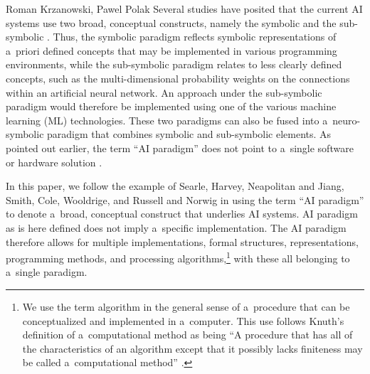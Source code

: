 \begin{artengenv2auth}{Roman Krzanowski, Pawel Polak}
Several studies have posited that the current AI systems use two broad, conceptual constructs, namely the symbolic and the sub-symbolic
\parencites[e.g.,][]{searle_mind_1998}[][]{harvey_perspectives_2013}[][]{neapolitan_artificial_2018}[][]{mitchell_artificial_2019}[][]{smith_promise_2019}[][]{cole_chinese}[][]{russell_artificial_2020}[][]{wooldridge_road_2021}. %
 Thus, the symbolic paradigm reflects symbolic representations of a~priori defined concepts that may be implemented in various programming environments, while the sub-symbolic paradigm relates to less clearly defined concepts, such as the multi-dimensional probability weights on the connections within an artificial neural network. An approach under the sub-symbolic paradigm would therefore be implemented using one of the various machine learning (ML) technologies. These two paradigms can also be fused into a~neuro-symbolic paradigm 
\parencites[e.g.,][]{bader_dimensions_2005}[][]{garcez_neural-symbolic_2019}[][]{garcez_neurosymbolic_2020}[][]{kautz_third_2022} %
 that combines symbolic and sub-symbolic elements. As pointed out earlier, the term ``AI paradigm'' does not point to a~single software or hardware solution 
\parencites[see][]{minsky_logical_1991}[][]{russell_artificial_2020}.%

In this paper, we follow the example of Searle, Harvey, Neapolitan and Jiang, Smith, Cole, Wooldrige, and Russell and Norwig in using the term ``AI paradigm'' to denote a~broad, conceptual construct that underlies AI systems. AI paradigm as is here defined does not imply a~specific implementation. The AI paradigm therefore allows for multiple implementations, formal structures, representations, programming methods, and processing algorithms,\footnote{We use the term algorithm in the general sense of a~procedure that can be conceptualized and implemented in a~computer. This use follows Knuth's definition of a~computational method as being ``A procedure that has all of the characteristics of an algorithm except that it possibly lacks finiteness may be called a~computational method''
\parencite[][p.5]{knuth_art_2005}.%
} with these all belonging to a~single paradigm.


\end{artengenv2auth}
